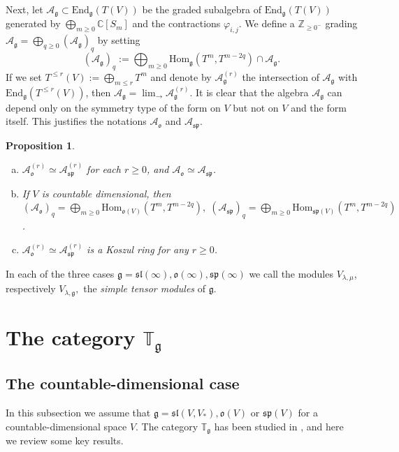 \documentclass[10pt]{amsart}
\newcounter{theorem}
\newtheorem{prop}[theo]{Proposition}
\newcommand {\ZZ} {\mathbb {Z}}
\newcommand {\CC} {\mathbb {C}}
\newcommand{\TT}{\mathbb{T}}
\renewcommand{\sp}{\mathfrak{sp}}
\renewcommand{\sl}{\mathfrak{sl}}
\newcommand{\oo}{\mathfrak{o}}
\renewcommand{\gg}{\mathfrak{g}}
\newcommand{\End}{\mathrm{End}}
\begin{document}
Next, let $\mathcal A_\gg\subset \End_{\gg}(T(V))$ be the graded
subalgebra of $\End_{\gg}(T(V))$ generated by 
$\bigoplus_{m\geq 0}\CC[S_m]$ and the contractions
$\varphi_{i,j}$. We define a $\ZZ_{\geq 0^-}$ grading  $\mathcal
A_{\gg}=\bigoplus_{q\geq 0} (\mathcal A_{\gg})_q$ by setting 
$$(\mathcal A_{\gg})_q:=\bigoplus_{m\geq 0}{\mathrm{Hom}}_\gg(T^m,T^{m-2q})\cap\mathcal A_{\gg}.$$ 
If we set $T^{\leq r}(V):=\bigoplus_{m\leq r} T^m$ and denote by
$\mathcal A_{\gg}^{(r)}$ the intersection of  
$\mathcal A_{\gg}$ with $\End_{\gg}(T^{\leq r}(V))$, then 
$\mathcal A_{\gg}=\displaystyle\lim_{\rightarrow}\mathcal
A_{\gg}^{(r)}$. It is clear that the algebra 
$\mathcal A_\gg$ can depend only on the symmetry type of the form on
$V$ but not on $V$ and the form itself. 
This justifies the notations $\mathcal A_{\oo}$ and $ \mathcal A_{\sp}$.


\begin{prop}\label{Koszul3} \cite{DPS}
\begin{enumerate}[a)]
 \item $\mathcal A_{\oo}^{(r)}\simeq \mathcal A_{\sp}^{(r)}$ for each $r\geq 0$, and  $\mathcal A_{\oo}\simeq \mathcal A_{\sp}$.
  \item If $V$ is countable dimensional, then $(\mathcal A_{\oo})_q = \bigoplus_{m\geq 0}{\mathrm{Hom}}_{\oo(V)}(T^m, T^{m-2q}),\;(\mathcal A_{\sp})_q = \bigoplus_{m\geq 0}{\mathrm{Hom}}_{\sp(V)}(T^m, T^{m-2q})$.
  \item $\mathcal A_{\oo}^{(r)}\simeq \mathcal A_{\sp}^{(r)}$ is a Koszul ring for any $r\geq0$.
\end{enumerate}
\end{prop}

In each of the three cases $\gg = \sl(\infty), \oo(\infty), \sp(\infty)$ we call the 
modules $V_{\lambda,\mu}$, respectively $V_{\lambda,\gg},$ the \textit{simple tensor modules} of $\gg$.

\section{The category $\TT_{\gg}$}\label{sect:5}

\subsection{The countable-dimensional case}\label{sect:5.1} 
In this subsection we assume that $\gg=\sl(V,V_*),\oo(V)$ or $\sp(V)$ for a countable-dimensional space $V$. The category  $\TT_{\gg}$ has been studied in \cite{DPS}, and here we review some key results.
\end{document}
